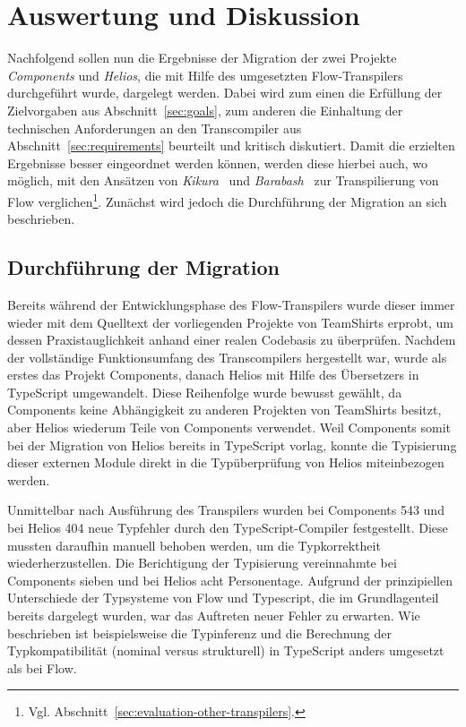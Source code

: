 \chapter{Auswertung und Diskussion}
\label{chap:evaluation}

Nachfolgend sollen nun die Ergebnisse der Migration der zwei Projekte \textit{Components} und \textit{Helios}, die mit Hilfe des umgesetzten Flow-Transpilers durchgeführt wurde, dargelegt werden. Dabei wird zum einen die Erfüllung der Zielvorgaben aus Abschnitt~\ref{sec:goals}, zum anderen die Einhaltung der technischen Anforderungen an den Transcompiler aus Abschnitt~\ref{sec:requirements} beurteilt und kritisch diskutiert. Damit die erzielten Ergebnisse besser eingeordnet werden können, werden diese hierbei auch, wo möglich, mit den Ansätzen von \textit{Kikura}~\autocite{KIKURA:FLOW_TO_TS} und \textit{Barabash}~\autocite{BARABASH:FLOW_TO_TS} zur Transpilierung von Flow verglichen\footnote{Vgl. Abschnitt~\ref{sec:evaluation-other-transpilers}.}. Zunächst wird jedoch die Durchführung der Migration an sich beschrieben.

\section{Durchführung der Migration}

Bereits während der Entwicklungsphase des Flow-Transpilers wurde dieser immer wieder mit dem Quelltext der vorliegenden Projekte von TeamShirts erprobt, um dessen Praxistauglichkeit anhand einer realen Codebasis zu überprüfen. Nachdem der vollständige Funktionsumfang des Transcompilers hergestellt war, wurde als erstes das Projekt Components, danach Helios mit Hilfe des Übersetzers in TypeScript umgewandelt. Diese Reihenfolge wurde bewusst gewählt, da Components keine Abhängigkeit zu anderen Projekten von TeamShirts besitzt, aber Helios wiederum Teile von Components verwendet. Weil Components somit bei der Migration von Helios bereits in TypeScript vorlag, konnte die Typisierung dieser externen Module direkt in die Typüberprüfung von Helios miteinbezogen werden.

Unmittelbar nach Ausführung des Transpilers wurden bei Components 543 und bei Helios 404 neue Typfehler durch den TypeScript-Compiler festgestellt. Diese mussten daraufhin manuell behoben werden, um die Typkorrektheit wiederherzustellen. Die Berichtigung der Typisierung vereinnahmte bei Components sieben und bei Helios acht Personentage. Aufgrund der prinzipiellen Unterschiede der Typsysteme von Flow und Typescript, die im Grundlagenteil bereits dargelegt wurden, war das Auftreten neuer Fehler zu erwarten. Wie beschrieben ist beispielsweise die Typinferenz und die Berechnung der Typkompatibilität (nominal versus strukturell) in TypeScript anders umgesetzt als bei Flow.


